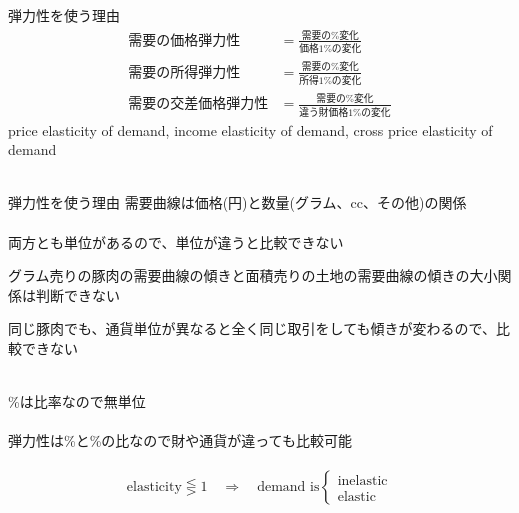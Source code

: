 \begin{frame}[c, label=WhyUseElasticity]{弾力性を使う理由}
\[
\begin{aligned}
\mbox{需要の価格弾力性}&=\frac{\mbox{需要の\%変化}}{\mbox{価格1\%の変化}}\\
\mbox{需要の所得弾力性}&=\frac{\mbox{需要の\%変化}}{\mbox{所得1\%の変化}}\\
\mbox{需要の交差価格弾力性}&=\frac{\mbox{需要の\%変化}}{\mbox{違う財価格1\%の変化}}
\end{aligned}
\]
price elasticity of demand, income elasticity of demand, cross price elasticity of demand\\~\\
\end{frame}\begin{frame}[c]{弾力性を使う理由}
需要曲線は価格(円)と数量(グラム、cc、その他)の関係\\~\\
両方とも単位があるので、単位が違うと比較できない
\begin{dinglist}{43}
\vspace{1.0ex}\setlength{\itemsep}{1.0ex}\setlength{\baselineskip}{12pt}
\item	グラム売りの豚肉の需要曲線の傾きと面積売りの土地の需要曲線の傾きの大小関係は判断できない
\item	同じ豚肉でも、通貨単位が異なると全く同じ取引をしても傾きが変わるので、比較できない\\~\\
\end{dinglist}

\%は比率なので無単位\\~\\
弾力性は\%と\%の比なので財や通貨が違っても比較可能\\~\\
\[
\mbox{elasticity}\lesseqgtr 1 \quad \Rightarrow \quad \mbox{demand is}\left\{
\begin{array}{c}
\mbox{inelastic}\\
\mbox{elastic}
\end{array}
\right.
\]
\end{frame}

